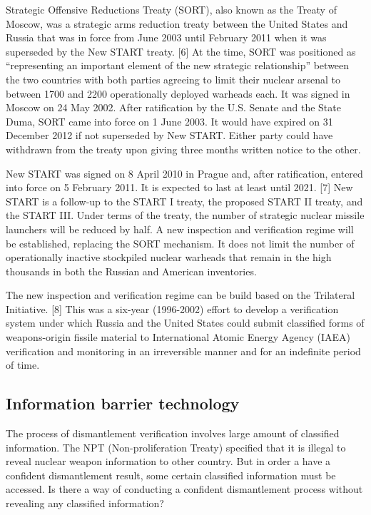 \documentclass[twoside,titlepage,11pt,twocolumn,a4paper]{article}
\begin{document}
Strategic Offensive Reductions Treaty (SORT), also known as the Treaty
of Moscow, was a strategic arms reduction treaty between the United 
States and Russia that was in force from June 2003 until February 2011 
when it was superseded by the New START treaty. [6] At the time, SORT 
was positioned as ``representing an important element of the new strategic
relationship'' between the two countries with both parties agreeing to 
limit their nuclear arsenal to between 1700 and 2200 operationally 
deployed warheads each. It was signed in Moscow on 24 May 2002. After
ratification by the U.S. Senate and the State Duma, SORT came into 
force on 1 June 2003. It would have expired on 31 December 2012 if 
not superseded by New START. Either party could have withdrawn from 
the treaty upon giving three months written notice to the other. 

New START was signed on 8 April 2010 in Prague and, after ratification, 
entered into force on 5 February 2011. It is expected to last at least 
until 2021. [7] New START is a follow-up to the START I treaty, the 
proposed START II treaty, and the START III. Under terms of the treaty, 
the number of strategic nuclear missile launchers will be reduced by 
half. A new inspection and verification regime will be established, 
replacing the SORT mechanism. It does not limit the number of 
operationally inactive stockpiled nuclear warheads that remain in
the high thousands in both the Russian and American inventories. 

The new inspection and verification regime can be build based on the 
Trilateral Initiative. [8] This was a six-year (1996-2002) effort to 
develop a verification system under which Russia and the United States
could submit classified forms of weapons-origin fissile material to 
International Atomic Energy Agency (IAEA) verification and monitoring
in an irreversible manner and for an indefinite period of time. 

\subsection{Information barrier technology}
The process of dismantlement verification involves large amount of
classified information. The NPT (Non-proliferation Treaty) specified
that it is illegal to reveal nuclear weapon information to other
country. But in order a have a confident dismantlement result, some
certain classified information must be accessed. Is there a way of
conducting a confident dismantlement process without revealing any
classified information?
\end{document}
